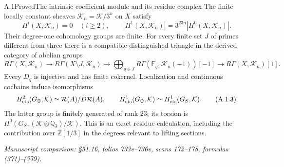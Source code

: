 \begin{statement}{A.1}{Proved}{The intrinsic coefficient module and its residue complex}
The finite locally constant sheaves $\mathcal K_n=\mathcal K/3^n$
on $X$ satisfy
\[
 H^i(X,\mathcal K_n)=0\quad(i\ge2),\qquad
 |H^1(X,\mathcal K_n)|=3^{23n}|H^0(X,\mathcal K_n)|.
 \tag{A.1.1}
\]
Their degree-one cohomology groups are finite. For every finite set
$J$ of primes different from three there is a compatible distinguished
triangle in the derived category of abelian groups
\[
 R\Gamma(X,\mathcal K_n)\longrightarrow
 R\Gamma(X\setminus J,\mathcal K_n)\longrightarrow
 \bigoplus_{q\in J}R\Gamma(\mathbb F_q,\mathcal K_n(-1))[-1]
 \longrightarrow R\Gamma(X,\mathcal K_n)[1].
 \tag{A.1.2}
\]
Every $D_q$ is injective and has finite cokernel. Localization and
continuous cochains induce isomorphisms
\[
 H^2_{\rm cts}(G_{\mathbb Q},\mathcal K)
       \simeq\mathcal R(A)/D\mathcal R(A),
 \qquad
 H^1_{\rm cts}(G_{\mathbb Q},\mathcal K)
       \simeq H^1_{\rm cts}(G_S,\mathcal K).
 \tag{A.1.3}
\]
The latter group is finitely generated of rank $23$; its torsion is
$H^0(G_S,(\mathcal K\otimes\mathbb Q_3)/\mathcal K)$.
This is an exact residue calculation, including the contribution over
$\mathbb Z[1/3]$ in the degrees relevant to lifting sections.
\par\smallskip\noindent\emph{Manuscript comparison: \S51.16,
folios 733v--736v, scans 172--178, formulas (371)--(379).}
\end{statement}
